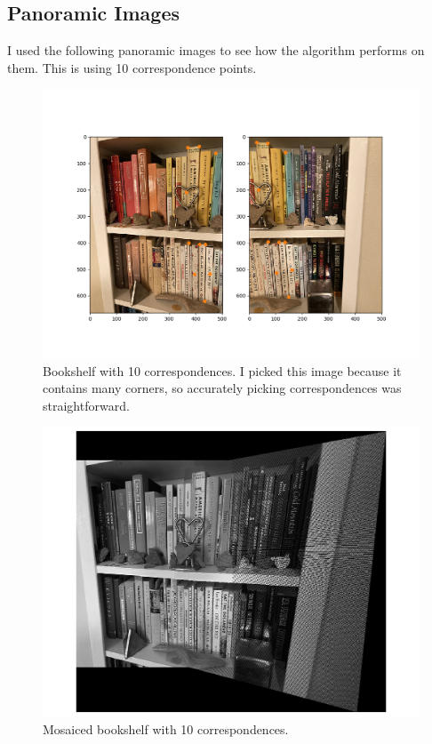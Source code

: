 \documentclass[]{article}
\begin{document}
	\newpage
	
	\subsection{Panoramic Images}
		I used the following panoramic images to see how the algorithm performs on them. This is using 10 correspondence points.
	\begin{figure}[H]
		\centering
		\includegraphics[width=6.5in]{test_images/shelf_10_correspondences.png}
		\caption{Bookshelf with 10 correspondences. I picked this image because it contains many corners, so accurately picking correspondences was straightforward.}
	\end{figure}

	\begin{figure}[H]
		\centering
		\includegraphics[width=6.5in]{test_images/shelf_10_floor.png}
		\caption{Mosaiced bookshelf with 10 correspondences. }
	\end{figure}
\end{document}
